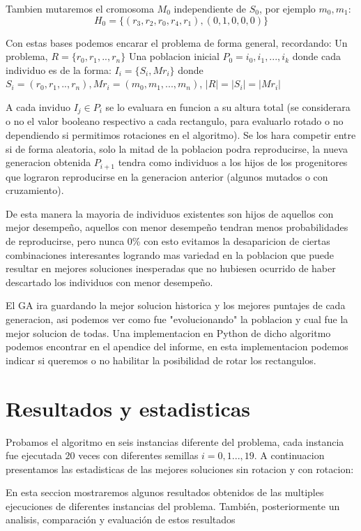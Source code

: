 \documentclass[10pt]{article}
\begin{document}
Tambien mutaremos el cromosoma $M_0$ independiente de $S_0$, por ejemplo $m_0,m_1$:
$$H_0=\{(r_3,r_2,r_0,r_4,r_1),(0,1,0,0,0)\}$$

Con estas bases podemos encarar el problema de forma general, recordando: 
Un problema, $R = \{r_0,r_1,..,r_n\}$
Una poblacion inicial $P_0={i_0,i_1,...,i_k}$ donde cada individuo es de la forma:
$I_i = \{S_i,Mr_i\}$ donde $S_i = (r_0,r_1,..,r_n), Mr_i = (m_0, m_1,...,m_n)$, $|R| = |S_i| = |Mr_i|$

A cada inviduo $I_j \in P_i$ se lo evaluara en funcion a su altura total (se considerara o no el valor booleano respectivo a cada rectangulo, para evaluarlo rotado o no dependiendo si permitimos rotaciones en el algoritmo). Se los hara competir entre si de forma aleatoria, solo la mitad de la poblacion podra reproducirse, la nueva generacion obtenida $P_{i+1}$ tendra como individuos a los hijos de los progenitores que lograron reproducirse en la generacion anterior (algunos mutados o con cruzamiento). 

De esta manera la mayoria de individuos existentes son hijos de aquellos con mejor desempeño, aquellos con menor desempeño tendran menos probabilidades de reproducirse, pero nunca 0\% con esto evitamos la desaparicion de ciertas combinaciones interesantes logrando mas variedad en la poblacion que puede resultar en mejores soluciones inesperadas que no hubiesen ocurrido de haber descartado los individuos con menor desempeño.

El GA ira guardando la mejor solucion historica y los mejores puntajes de cada generacion, asi podemos ver como fue "evolucionando" la poblacion y cual fue la mejor solucion de todas. Una implementacion en Python de dicho algoritmo podemos encontrar en el apendice del informe, en esta implementacion podemos indicar si queremos o no habilitar la posibilidad de rotar los rectangulos.

\section{Resultados y estadisticas} %
 
Probamos el algoritmo en seis instancias diferente del problema, cada instancia fue ejecutada $20$ veces con diferentes semillas $i=0,1...,19$. A continuacion presentamos las estadisticas de las mejores soluciones sin rotacion y con rotacion:

\label{sec:Estadisticas}%

En esta seccion mostraremos algunos resultados obtenidos de las multiples ejecuciones de diferentes instancias del problema.%
También, posteriormente un analisis, comparación y evaluación de estos resultados%
\end{document}
